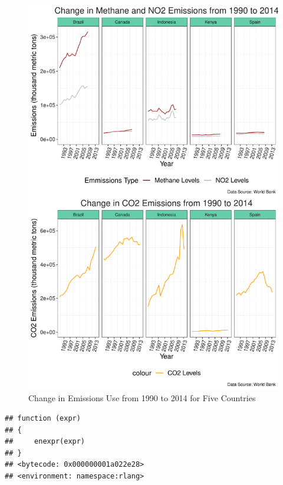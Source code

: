 \documentclass[12pt,]{article}
\begin{document}
\begin{figure}
\centering
\includegraphics{Marx_ENV872_Project_files/figure-latex/unnamed-chunk-5-1.pdf}
\caption{\label{fig:fig4}Change in Emissions Use from 1990 to 2014 for
Five Countries}
\end{figure}

\begin{verbatim}
## function (expr) 
## {
##     enexpr(expr)
## }
## <bytecode: 0x000000001a022e28>
## <environment: namespace:rlang>
\end{verbatim}
\end{document}
